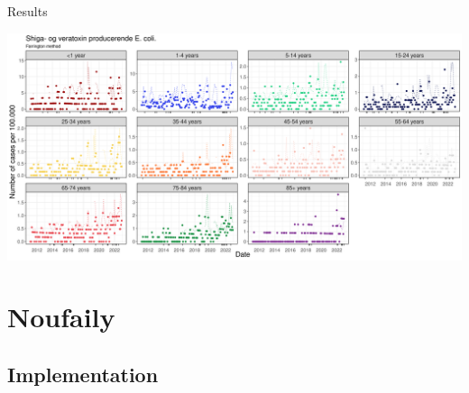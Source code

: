 \documentclass[aspectratio=169]{beamer}
\begin{document}
\begin{frame}{Results}
\tiny

\includegraphics[width=1\linewidth]{../figures/STEC_farrington}

\normalsize
\end{frame}

\hypertarget{noufaily}{%
\section{Noufaily}\label{noufaily}}

\hypertarget{implementation-1}{%
\subsection{Implementation}\label{implementation-1}}
\end{document}
